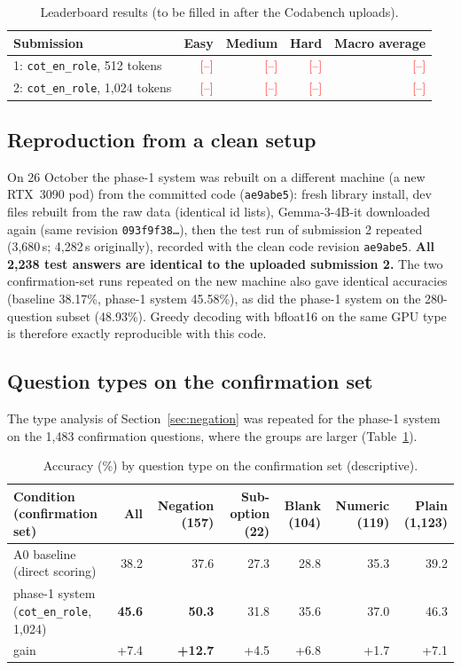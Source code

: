 \documentclass[10pt,a4paper]{article}
\newcommand{\cond}[1]{\texttt{#1}}
\newcommand{\todo}[1]{\textcolor{red}{[#1]}}
\begin{document}
\begin{table}[h]
\centering\small
\begin{tabular}{lrrrr}
\toprule
Submission & Easy & Medium & Hard & Macro average\\
\midrule
1: \cond{cot\_en\_role}, 512 tokens & \todo{--} & \todo{--} & \todo{--} & \todo{--}\\
2: \cond{cot\_en\_role}, 1,024 tokens & \todo{--} & \todo{--} & \todo{--} & \todo{--}\\
\bottomrule
\end{tabular}
\caption{Leaderboard results (to be filled in after the Codabench uploads).}
\end{table}

\subsection{Reproduction from a clean setup}\label{sec:reproduction}
On 26 October the phase-1 system was rebuilt on a different machine (a new RTX~3090 pod) from the committed code
(\texttt{ae9abe5}): fresh library install, dev files rebuilt from the raw data (identical id lists), Gemma-3-4B-it
downloaded again (same revision \texttt{093f9f38\ldots}), then the test run of submission 2 repeated (3,680\,s; 4,282\,s
originally), recorded with the clean code revision \texttt{ae9abe5}.
\textbf{All 2,238 test answers are identical to the uploaded submission 2.} The two confirmation-set runs repeated on
the new machine also gave identical accuracies (baseline 38.17\%, phase-1 system 45.58\%), as did the phase-1 system on
the 280-question subset (48.93\%). Greedy decoding with bfloat16 on the same GPU type is therefore exactly
reproducible with this code.

\subsection{Question types on the confirmation set}
The type analysis of Section~\ref{sec:negation} was repeated for the phase-1 system on the 1,483 confirmation questions,
where the groups are larger (Table~\ref{tab:qtypes_rest}).

\begin{table}[h]
\centering\footnotesize\setlength{\tabcolsep}{4pt}
\begin{tabular}{lrrrrrr}
\toprule
Condition (confirmation set) & All & Negation (157) & Sub-option (22) & Blank (104) & Numeric (119) & Plain (1,123)\\
\midrule
A0 baseline (direct scoring) & 38.2 & 37.6 & 27.3 & 28.8 & 35.3 & 39.2\\
phase-1 system (\cond{cot\_en\_role}, 1,024) & \textbf{45.6} & \textbf{50.3} & 31.8 & 35.6 & 37.0 & 46.3\\
gain & +7.4 & \textbf{+12.7} & +4.5 & +6.8 & +1.7 & +7.1\\
\bottomrule
\end{tabular}
\caption{Accuracy (\%) by question type on the confirmation set (descriptive).}
\label{tab:qtypes_rest}
\end{table}
\end{document}
